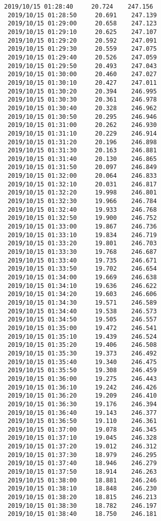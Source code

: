 \documentclass[11pt]{article}
\begin{document}
\begin{Verbatim}[commandchars=\\\{\}]
 2019/10/15 01:28:40     20.724    247.156
 2019/10/15 01:28:50     20.691    247.139
 2019/10/15 01:29:00     20.658    247.123
 2019/10/15 01:29:10     20.625    247.107
 2019/10/15 01:29:20     20.592    247.091
 2019/10/15 01:29:30     20.559    247.075
 2019/10/15 01:29:40     20.526    247.059
 2019/10/15 01:29:50     20.493    247.043
 2019/10/15 01:30:00     20.460    247.027
 2019/10/15 01:30:10     20.427    247.011
 2019/10/15 01:30:20     20.394    246.995
 2019/10/15 01:30:30     20.361    246.978
 2019/10/15 01:30:40     20.328    246.962
 2019/10/15 01:30:50     20.295    246.946
 2019/10/15 01:31:00     20.262    246.930
 2019/10/15 01:31:10     20.229    246.914
 2019/10/15 01:31:20     20.196    246.898
 2019/10/15 01:31:30     20.163    246.881
 2019/10/15 01:31:40     20.130    246.865
 2019/10/15 01:31:50     20.097    246.849
 2019/10/15 01:32:00     20.064    246.833
 2019/10/15 01:32:10     20.031    246.817
 2019/10/15 01:32:20     19.998    246.801
 2019/10/15 01:32:30     19.966    246.784
 2019/10/15 01:32:40     19.933    246.768
 2019/10/15 01:32:50     19.900    246.752
 2019/10/15 01:33:00     19.867    246.736
 2019/10/15 01:33:10     19.834    246.719
 2019/10/15 01:33:20     19.801    246.703
 2019/10/15 01:33:30     19.768    246.687
 2019/10/15 01:33:40     19.735    246.671
 2019/10/15 01:33:50     19.702    246.654
 2019/10/15 01:34:00     19.669    246.638
 2019/10/15 01:34:10     19.636    246.622
 2019/10/15 01:34:20     19.603    246.606
 2019/10/15 01:34:30     19.571    246.589
 2019/10/15 01:34:40     19.538    246.573
 2019/10/15 01:34:50     19.505    246.557
 2019/10/15 01:35:00     19.472    246.541
 2019/10/15 01:35:10     19.439    246.524
 2019/10/15 01:35:20     19.406    246.508
 2019/10/15 01:35:30     19.373    246.492
 2019/10/15 01:35:40     19.340    246.475
 2019/10/15 01:35:50     19.308    246.459
 2019/10/15 01:36:00     19.275    246.443
 2019/10/15 01:36:10     19.242    246.426
 2019/10/15 01:36:20     19.209    246.410
 2019/10/15 01:36:30     19.176    246.394
 2019/10/15 01:36:40     19.143    246.377
 2019/10/15 01:36:50     19.110    246.361
 2019/10/15 01:37:00     19.078    246.345
 2019/10/15 01:37:10     19.045    246.328
 2019/10/15 01:37:20     19.012    246.312
 2019/10/15 01:37:30     18.979    246.295
 2019/10/15 01:37:40     18.946    246.279
 2019/10/15 01:37:50     18.914    246.263
 2019/10/15 01:38:00     18.881    246.246
 2019/10/15 01:38:10     18.848    246.230
 2019/10/15 01:38:20     18.815    246.213
 2019/10/15 01:38:30     18.782    246.197
 2019/10/15 01:38:40     18.750    246.181

\end{Verbatim}
\end{document}
